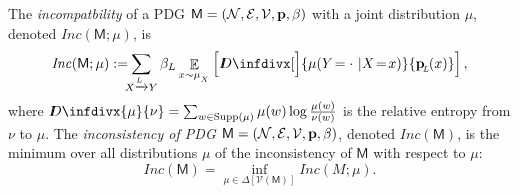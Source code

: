 \documentclass{article}
\theoremstyle{plain}
\theoremstyle{definition}
\theoremstyle{remark}
\newcommand{\thickD}{I\mkern-8muD}
\newcommand{\kldiv}{\thickD\infdivx}%
\newcommand\mat[1]{\mathbf{#1}}
\def\sheq{\!=\!}
\newcommand{\bmu}{\boldsymbol{\mu}}
\newcommand{\bp}[1][L]{\mat{p}_{\!_{#1}\!}}
\newcommand{\V}{\mathcal V}
\newcommand{\sfM}{\mathsf M}
\newcommand\inconsist{\mathit{Inc}}
\newcommand{\ed}[3]{#2 \xrightarrow{\!\!\smash{#1}\vphantom{g}} #3}
\newcommand{\alle}[1][L]{_{ \ed {#1}XY}}
\numberwithin{equation}{section}
\begin{document}
	\begin{defn}\label{def:zeta-score}
	       	The \emph{incompatbility} of a PDG $\sfM = \mnvars[]$ with
		a joint distribution $\mu$,	
          denoted $\inconsist(\sfM;\mu)$, is  
	  \[
			\inconsist(\sfM ; \mu) := %
			\!\!\!\sum
				\alle
						\beta_L
                        \mathop{\mathbb E}_{x \sim \mu_{_X}}
                        \left[\kldiv[\Big]{ \mu(Y\!= \cdot\ | X \sheq
                                                        x) }{\bp(x) } \right] ,
		\]
		where $\kldiv{\mu}{\nu} = \sum_{w \in \text{Supp($\mu$)}} \mu(w) \log\frac{\mu(w)}{\nu(w)}$ is the 
		relative
		entropy from $\nu$ to $\mu$.
        The \emph{inconsistency of PDG $\sfM = \mnvars[]$},
                denoted $\inconsist(\sfM)$, is the
        minimum over all distributions $\mu$ of the inconsistency of $\sfM$ with respect to $\mu$:  
		\[ \inconsist(\sfM) = \inf_{\mu \in \Delta [\V(\sfM)]}
                \inconsist (M; \mu) . \]
        \end{defn}
\end{document}
